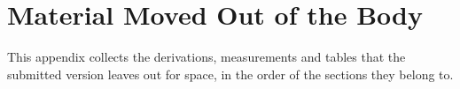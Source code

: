 \documentclass[conference,compsoc]{IEEEtran}
\theoremstyle{plain}
\theoremstyle{definition}
\theoremstyle{remark}
\begin{document}
\appendices
\ifdefined\pviextended





\section{Material Moved Out of the Body}
\label{app:ext}
This appendix collects the derivations, measurements and tables that the submitted version leaves out for space,
in the order of the sections they belong to.







\else

\fi
\end{document}
